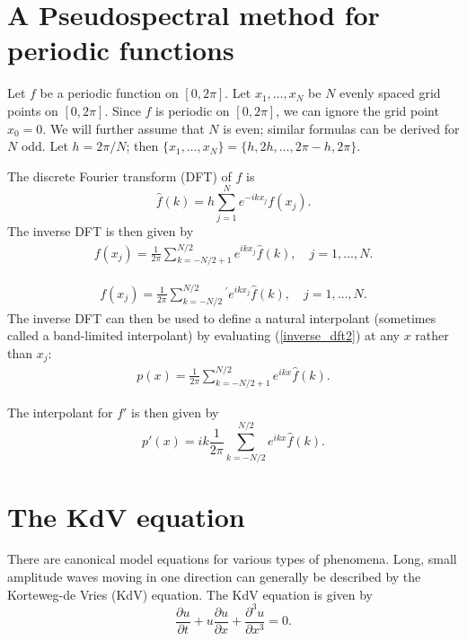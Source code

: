 \label{lab:pseudospectral2}


\section{A Pseudospectral method for periodic functions}
Let $f$ be a periodic function on $[0,2\pi]$. Let $x_1,\ldots,x_N$ be $N$ evenly spaced grid points on $[0,2\pi].$ Since $f$ is periodic on $[0,2\pi]$, we can ignore the grid point $x_0 = 0$. We will further assume that $N$ is even; similar formulas can be derived for $N$ odd. Let $h = 2\pi/N$; then $\{x_1,\ldots,x_N\} = \{h,2h,\ldots,2\pi-h,2\pi\}$.  

The discrete Fourier transform (DFT) of $f$ is 
\[
\hat{f}(k) = h \sum_{j=1}^N e^{-ikx_j}f(x_j).
\]
The inverse DFT is then given by
\begin{align}
f(x_j) = \frac{1}{2\pi}\sum_{k=-N/2+1}^{N/2}e^{ikx_j}\hat{f}(k), \quad j = 1,\ldots, N. \label{inverse_dft1}
\end{align}

\begin{align}
f(x_j) = \frac{1}{2\pi}\sum_{k=-N/2}^{N/2}\!\!{}^{'} e^{ikx_j}\hat{f}(k), \quad j = 1,\ldots, N. \label{inverse_dft2}
\end{align}
The inverse DFT can then be used to define a natural interpolant (sometimes called a band-limited interpolant) by evaluating (\ref{inverse_dft2}) at any $x$ rather than $x_j$:
\begin{align}
p(x) = \frac{1}{2\pi}\sum_{k=-N/2+1}^{N/2} e^{ikx}\hat{f}(k). \label{interpolant}
\end{align}


The interpolant for $f'$ is then given by 
\[
p'(x) = ik \frac{1}{2\pi}\sum_{k=-N/2}^{N/2} e^{ikx}\hat{f}(k).
\]



\section{The KdV equation}

There are canonical model equations for various types of phenomena.  Long, small amplitude waves moving in one direction can generally be described by the  Korteweg-de Vries (KdV) equation. The KdV equation is given by 
\[  \frac{\partial u }{\partial t} + u \frac{\partial u}{\partial x} + \frac{\partial^3 u}{\partial x^3} = 0.
\]

